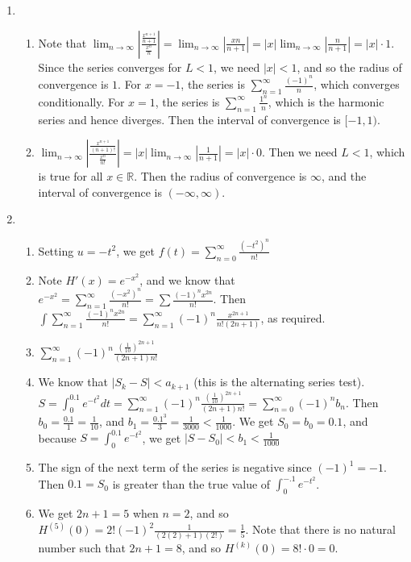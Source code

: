 \documentclass[10pt,english]{article}
\begin{document}
\begin{enumerate}
\item \begin{enumerate}
    \item Note that $\lim_{n\rightarrow\infty}\left|\frac{\frac{x^{n+1}}{n+1}}{\frac{x^n}{n}}\right|=\lim_{n\rightarrow\infty}\left|\frac{xn}{n+1}\right|=|x|\lim_{n\rightarrow\infty}\left|\frac{n}{n+1}\right|=|x|\cdot 1$. Since the series converges for $L<1$, we need $|x|<1$, and so the radius of convergence is $1$. For $x=-1$, the series is $\sum_{n=1}^\infty\frac{(-1)^n}{n}$, which converges conditionally. For $x=1$, the series is $\sum_{n=1}^\infty\frac{1^n}{n}$, which is the harmonic series and hence diverges. Then the interval of convergence is $[-1,1)$. 
    \item $\lim_{n\rightarrow\infty}\left|\frac{\frac{x^{n+1}}{(n+1)!}}{\frac{x^n}{n!}}\right|=|x|\lim_{n\rightarrow\infty}\left|\frac{1}{n+1}\right|=|x|\cdot 0$. Then we need $L<1$, which is true for all $x\in\mathbb{R}$. Then the radius of convergence is $\infty$, and the interval of convergence is $(-\infty,\infty)$. 
\end{enumerate}



\item \begin{enumerate}
    \item Setting $u=-t^2$, we get $f(t)=\sum_{n=0}^\infty\frac{(-t^2)^n}{n!}$
    \item Note $H'(x)=e^{-x^2}$, and we know that $e^{-x^2}=\sum_{n=1}^\infty\frac{(-x^2)^n}{n!}=\sum\frac{(-1)^nx^{2n}}{n!}$. Then $\int\sum_{n=1}^\infty\frac{(-1)^nx^{2n}}{n!}=\sum_{n=1}^\infty(-1)^n\frac{x^{2n+1}}{n!(2n+1)}$, as required.
    \item $\sum_{n=1}^\infty(-1)^n\frac{\left(\frac{1}{10}\right)^{2n+1}}{(2n+1)n!}$
    \item We know that $|S_k-S|<a_{k+1}$ (this is the alternating series test). $S=\int_{0}^{0.1}e^{-t^2}dt=\sum_{n=1}^\infty(-1)^n\frac{\left(\frac{1}{10}\right)^{2n+1}}{(2n+1)n!}=\sum_{n=0}^\infty(-1)^nb_n$. Then $b_0=\frac{0.1}{1}=\frac{1}{10}$, and $b_1=\frac{0.1^3}{3}=\frac{1}{3000}<\frac{1}{1000}$. We get $S_0=b_0=0.1$, and because $S=\int_0^{0.1}e^{-t^2}$, we get $|S-S_0|<b_1<\frac{1}{1000}$
    \item The sign of the next term of the series is negative since $(-1)^1=-1$. Then $0.1=S_0$ is greater than the true value of $\int_0^{-.1}e^{-t^2}$. 
    \item We get $2n+1=5$ when $n=2$, and so $H^{(5)}(0)=2!(-1)^2\frac{1}{(2(2)+1)(2!)}=\frac{1}{5}$. Note that there is no natural number such that $2n+1=8$, and so $H^{(k)}(0)=8!\cdot 0 = 0$. 
\end{enumerate}




\end{enumerate}
\end{document}
